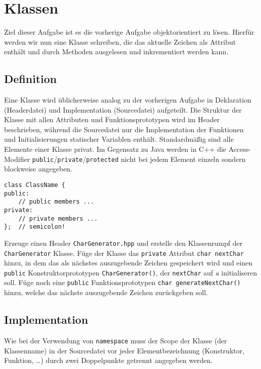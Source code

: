 \section{Klassen}
Ziel dieser Aufgabe ist es die vorherige Aufgabe objektorientiert zu lösen. Hierfür werden wir nun eine Klasse schreiben, die das aktuelle Zeichen als Attribut enthält und durch Methoden ausgelesen und inkrementiert werden kann.

\subsection{Definition}
Eine Klasse wird üblicherweise analog zu der vorherigen Aufgabe in Deklaration (Headerdatei) und Implementation (Sourcedatei) aufgeteilt.
Die Struktur der Klasse mit allen Attributen und Funktionsprototypen wird im Header beschrieben, während die Sourcedatei nur die Implementation der Funktionen und Initialisierungen statischer Variablen enthält.
Standardmäßig sind alle Elemente einer Klasse privat.
Im Gegensatz zu Java werden in C++ die Access-Modifier \texttt{public}/\texttt{private}/\texttt{protected} nicht bei jedem Element einzeln sondern blockweise angegeben.

\begin{lstlisting}
class ClassName {
public:
	// public members ...
private:
	// private members ...
};	// semicolon!
\end{lstlisting}

Erzeuge einen Header \texttt{CharGenerator.hpp} und erstelle den Klassenrumpf der \texttt{CharGenerator} Klasse.
Füge der Klasse das \texttt{private} Attribut \texttt{char nextChar} hinzu, in dem das als nächstes auszugebende Zeichen gespeichert wird und einen \texttt{public} Konstruktorprototypen \texttt{CharGenerator()}, der \texttt{nextChar} auf \emph{a} initialiseren soll.
Füge noch eine \texttt{public} Funktionsprototypen \texttt{char generateNextChar()} hinzu, welche das nächste auszugebende Zeichen zurückgeben soll.



\subsection{Implementation}
Wie bei der Verwendung von \texttt{namespace} muss der Scope der Klasse (der Klassenname) in der Sourcedatei vor jeder Elementbezeichnung (Konstruktor, Funktion, \dots) durch zwei Doppelpunkte getrennt angegeben werden.

